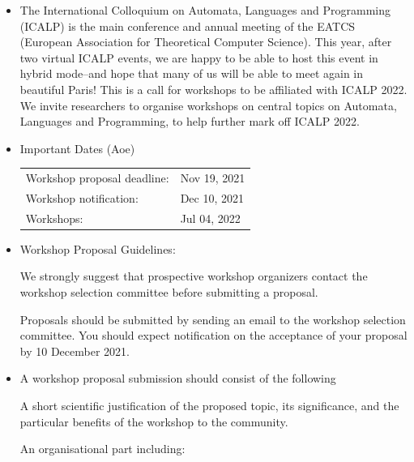 \documentclass[prodmode,acmtecs]{acmsmall} %
\begin{document}
\begin{itemize}\item  The International Colloquium on Automata, Languages and Programming (ICALP) is the main conference and annual meeting of the EATCS (European Association for Theoretical Computer Science). This year, after two virtual ICALP events, we are happy to be able to host this event in hybrid mode--and hope that many of us will be able to meet again in beautiful Paris!  This is a call for workshops to be affiliated with ICALP 2022. We invite researchers to organise workshops on central topics on Automata, Languages and Programming, to help further mark off ICALP 2022.  
 
\item  Important Dates (Aoe) 
 
\begin{tabulary}{\linewidth}{LL}Workshop proposal deadline:  & Nov 19, 2021 \\
Workshop notification:  & Dec 10, 2021 \\
Workshops:  & Jul 04, 2022 \\
\end{tabulary}
 
\item  Workshop Proposal Guidelines: 
 
  We strongly suggest that prospective workshop organizers contact the workshop selection committee before submitting a proposal. 
 
  Proposals should be submitted  by sending an email to the workshop selection committee. You should expect notification on the acceptance of your proposal by 10 December 2021. 
 
\item  A workshop proposal submission should consist of the following  
 
  A short scientific justification of the proposed topic, its significance, and the particular benefits of the workshop to the community. 
 
  An organisational part including: 
 

\end{itemize}
\end{document}
